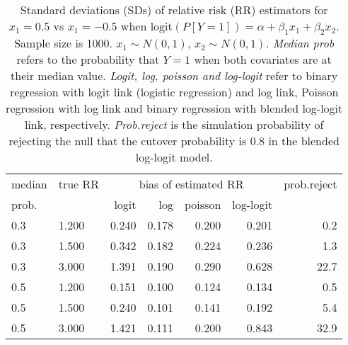\documentclass[12pt,a4paper]{article}
\begin{document}
\begin{table}[H] 
\small\sf\centering 
\caption{Standard deviations (SDs) of relative risk (RR) estimators for $x_1=0.5$ vs $x_1=-0.5$ when $\mbox{logit}(P[Y=1])=\alpha+\beta_1 x_1 + \beta_2 x_2$. Sample size is 1000. $x_1 \sim $$N(0,1)$, $x_2 \sim N(0,1)$. {\it Median prob} refers to the probability that $Y=1$ when both covariates are at their median value. {\it Logit, log, poisson and log-logit} refer to binary regression with logit link (logistic regression) and log link, Poisson regression with log link and binary regression with blended log-logit link, respectively. {\it Prob.reject} is the simulation probability of rejecting the null that the cutover probability is $0.8$ in the blended log-logit model.} 
\begin{tabular}{llrrrrr} 
\toprule 
median & true RR & \multicolumn{4}{c}{bias of estimated RR} & prob.reject \\ 
prob. & & logit & log & poisson & log-logit  & \\ \midrule 
0.3 & 1.200 & 0.240 & 0.178 & 0.200 & 0.201 &  0.2 \\  
0.3 & 1.500 & 0.342 & 0.182 & 0.224 & 0.236 &  1.3 \\  
0.3 & 3.000 & 1.391 & 0.190 & 0.290 & 0.628 & 22.7 \\  
0.5 & 1.200 & 0.151 & 0.100 & 0.124 & 0.134 &  0.5 \\  
0.5 & 1.500 & 0.240 & 0.101 & 0.141 & 0.192 &  5.4 \\  
0.5 & 3.000 & 1.421 & 0.111 & 0.200 & 0.843 & 32.9 \\  
\bottomrule 
\end{tabular} 
\end{table} 
\end{document}
